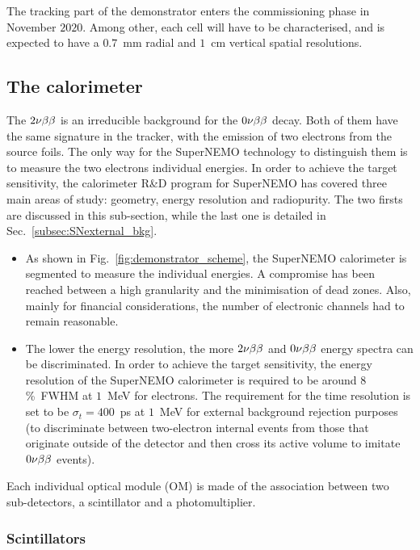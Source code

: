 The tracking part of the demonstrator enters the commissioning phase in November $2020$.
Among other, each cell will have to be characterised, and is expected to have a $0.7$~mm radial and $1$~cm vertical spatial resolutions.


\subsection{The calorimeter}
\label{subsec:SN_calo}

The $2\nu\beta\beta$ is an irreducible background for the $0\nu\beta\beta$ decay.
Both of them have the same signature in the tracker, with the emission of two electrons from the source foils.
The only way for the SuperNEMO technology to distinguish them is to measure the two electrons individual energies.
In order to achieve the target sensitivity, the calorimeter R\&D program for SuperNEMO has covered three main areas of study: geometry, energy resolution and radiopurity.
The two firsts are discussed in this sub-section, while the last one is detailed in Sec.~\ref{subsec:SNexternal_bkg}.
\begin{itemize}
\item As shown in Fig.~\ref{fig:demonstrator_scheme}, the SuperNEMO calorimeter is segmented to measure the individual energies.
A compromise has been reached between a high granularity and the minimisation of dead zones.
Also, mainly for financial considerations, the number of electronic channels had to remain reasonable.
\item The lower the energy resolution, the more $2\nu\beta\beta$ and $0\nu\beta\beta$ energy spectra can be discriminated.
In order to achieve the target sensitivity, the energy resolution of the SuperNEMO calorimeter is required to be around $8$\%~FWHM at $1$~MeV for electrons.
The requirement for the time resolution is set to be ${\sigma_{t}=400}$~ps at $1$~MeV for external background rejection purposes (to discriminate between two-electron internal events from those that originate outside of the detector and then cross its active volume to imitate $0\nu\beta\beta$ events).
\end{itemize}
Each individual optical module (OM) is made of the association between two sub-detectors, a scintillator and a photomultiplier.


\subsubsection*{Scintillators}

